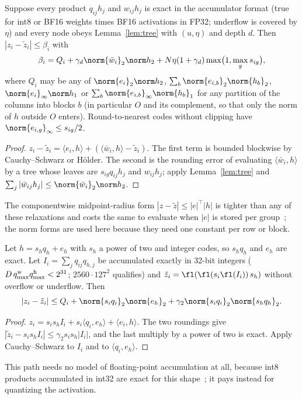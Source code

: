 \begin{theorem}[Envelope]\label{thm:envelope}
Suppose every product $q_{ij}h_j$ and $w_{ij}h_j$ is exact in the accumulator format (true for int8 or BF16 weights times BF16 activations in FP32; underflow is covered by $\eta$) and every node obeys Lemma~\ref{lem:tree} with $(u,\eta)$ and depth $d$. Then $|z_i-\tilde z_i|\le\beta_i$ with
\begin{equation}
\beta_i=Q_i+\gamma_d\norm{\bar w_i}_2\norm h_2+N\eta(1+\gamma_d)\max\bigl(1,\max_gs_{ig}\bigr),\label{eq:envelope}
\end{equation}
where $Q_i$ may be any of $\norm{e_i}_2\norm h_2$, $\sum_b\norm{e_{i,b}}_2\norm{h_b}_2$, $\norm{e_i}_\infty\norm h_1$ or $\sum_b\norm{e_{i,b}}_\infty\norm{h_b}_1$ for any partition of the columns into blocks $b$ (in particular $O$ and its complement, so that only the norm of $h$ outside $O$ enters). Round-to-nearest codes without clipping have $\norm{e_{i,g}}_\infty\le s_{ig}/2$.
\end{theorem}
\begin{proof}
$z_i-\tilde z_i=\langle e_i,h\rangle+(\langle\bar w_i,h\rangle-\tilde z_i)$. The first term is bounded blockwise by Cauchy--Schwarz or Hölder. The second is the rounding error of evaluating $\langle\bar w_i,h\rangle$ by a tree whose leaves are $s_{ig}q_{ij}h_j$ and $w_{ij}h_j$; apply Lemma~\ref{lem:tree} and $\sum_j|\bar w_{ij}h_j|\le\norm{\bar w_i}_2\norm h_2$.
\end{proof}
The componentwise midpoint-radius form $|z-\tilde z|\le|e|^\top|h|$ is tighter than any of these relaxations and costs the same to evaluate when $|e|$ is stored per group~\cite{rump2010}; the norm forms are used here because they need one constant per row or block.

\begin{theorem}\label{thm:integer}
Let $h=s_hq_h+e_h$ with $s_h$ a power of two and integer codes, so $s_hq_h$ and $e_h$ are exact. Let $I_i=\sum_jq_{ij}q_{h,j}$ be accumulated exactly in 32-bit integers ($D\,q^{\rm w}_{\max}q^{\rm h}_{\max}<2^{31}$; $2560\cdot127^2$ qualifies) and $\tilde z_i=\fl(\fl(s_i\fl(I_i))\,s_h)$ without overflow or underflow. Then
\[|z_i-\tilde z_i|\le Q_i+\norm{s_iq_i}_2\norm{e_h}_2+\gamma_2\norm{s_iq_i}_2\norm{s_hq_h}_2.\]
\end{theorem}
\begin{proof}
$z_i=s_is_hI_i+s_i\langle q_i,e_h\rangle+\langle e_i,h\rangle$. The two roundings give $|\tilde z_i-s_is_hI_i|\le\gamma_2s_is_h|I_i|$, and the last multiply by a power of two is exact. Apply Cauchy--Schwarz to $I_i$ and to $\langle q_i,e_h\rangle$.
\end{proof}
This path needs no model of floating-point accumulation at all, because int8 products accumulated in int32 are exact for this shape~\cite{abdelfattah2025}; it pays instead for quantizing the activation.

